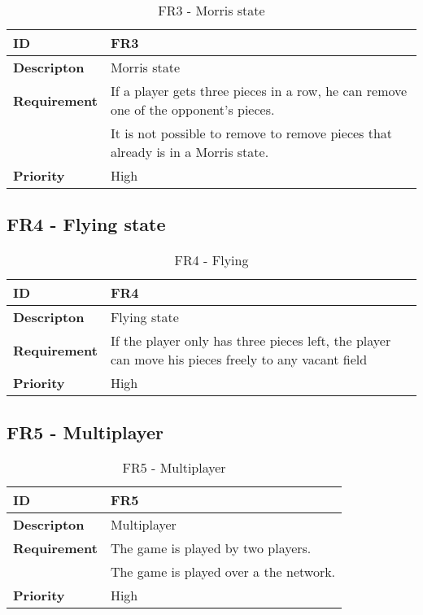 \begin{table}[h!]
\begin{tabular}{ | p{90pt} | p{270pt}  |}
\hline
\bf ID &  FR3  \\ \hline
\bf Descripton & Morris state \\ \hline 
\bf Requirement & If a player gets three pieces in a row, he can remove one of the opponent's pieces.  \\
& It is not possible to remove to remove pieces that already is in a Morris state. \\ \hline
\bf Priority & High \\ \hline

\end{tabular}
\caption{FR3 - Morris state}
\end{table}

\subsection{FR4 - Flying state}

\begin{table}[h!]
\begin{tabular}{ | p{90pt} | p{270pt}  |}
\hline
\bf ID &  FR4  \\ \hline
\bf Descripton & Flying state \\ \hline 
\bf Requirement & If the player only has three pieces left, the player can move his pieces freely to any vacant field \\ \hline
\bf Priority & High \\ \hline

\end{tabular}
\caption{FR4 - Flying}
\end{table}

\subsection{FR5 - Multiplayer}

\begin{table}[h!]
\begin{tabular}{ | p{90pt} | p{270pt}  |}
\hline
\bf ID &  FR5  \\ \hline
\bf Descripton & Multiplayer \\ \hline 
\bf Requirement & The game is played by two players.  \\   
& The game is played over a the network. \\  \hline
\bf Priority & High \\ \hline

\end{tabular}
\caption{FR5 - Multiplayer}
\end{table}

